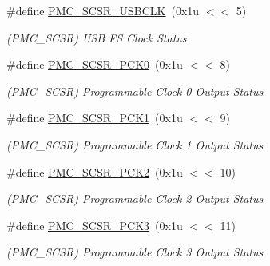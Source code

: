 \begin{DoxyCompactItemize}
\mbox{\label{group__SAMS70__PMC_gaae4649949446a4c6141a337bc45b1c30}} 
\#define \mbox{\hyperlink{group__SAMS70__PMC_gaae4649949446a4c6141a337bc45b1c30}{P\+M\+C\+\_\+\+S\+C\+S\+R\+\_\+\+U\+S\+B\+C\+LK}}~(0x1u $<$$<$ 5)
\begin{DoxyCompactList}\small\item\em (P\+M\+C\+\_\+\+S\+C\+SR) U\+SB FS Clock Status \end{DoxyCompactList}\item 
\mbox{\label{group__SAMS70__PMC_ga6eabb3e97d15e03c3d972905170d971c}} 
\#define \mbox{\hyperlink{group__SAMS70__PMC_ga6eabb3e97d15e03c3d972905170d971c}{P\+M\+C\+\_\+\+S\+C\+S\+R\+\_\+\+P\+C\+K0}}~(0x1u $<$$<$ 8)
\begin{DoxyCompactList}\small\item\em (P\+M\+C\+\_\+\+S\+C\+SR) Programmable Clock 0 Output Status \end{DoxyCompactList}\item 
\mbox{\label{group__SAMS70__PMC_gaeb9d3d3ebc60d5e7c5770b2ff71c6279}} 
\#define \mbox{\hyperlink{group__SAMS70__PMC_gaeb9d3d3ebc60d5e7c5770b2ff71c6279}{P\+M\+C\+\_\+\+S\+C\+S\+R\+\_\+\+P\+C\+K1}}~(0x1u $<$$<$ 9)
\begin{DoxyCompactList}\small\item\em (P\+M\+C\+\_\+\+S\+C\+SR) Programmable Clock 1 Output Status \end{DoxyCompactList}\item 
\mbox{\label{group__SAMS70__PMC_gab940ccf3130ecb8a67ca288ac82e6ee6}} 
\#define \mbox{\hyperlink{group__SAMS70__PMC_gab940ccf3130ecb8a67ca288ac82e6ee6}{P\+M\+C\+\_\+\+S\+C\+S\+R\+\_\+\+P\+C\+K2}}~(0x1u $<$$<$ 10)
\begin{DoxyCompactList}\small\item\em (P\+M\+C\+\_\+\+S\+C\+SR) Programmable Clock 2 Output Status \end{DoxyCompactList}\item 
\mbox{\label{group__SAMS70__PMC_ga7d3acd858a83842e2f9bea868f11cbd1}} 
\#define \mbox{\hyperlink{group__SAMS70__PMC_ga7d3acd858a83842e2f9bea868f11cbd1}{P\+M\+C\+\_\+\+S\+C\+S\+R\+\_\+\+P\+C\+K3}}~(0x1u $<$$<$ 11)
\begin{DoxyCompactList}\small\item\em (P\+M\+C\+\_\+\+S\+C\+SR) Programmable Clock 3 Output Status \end{DoxyCompactList}\item 
$$
\end{DoxyCompactItemize}
